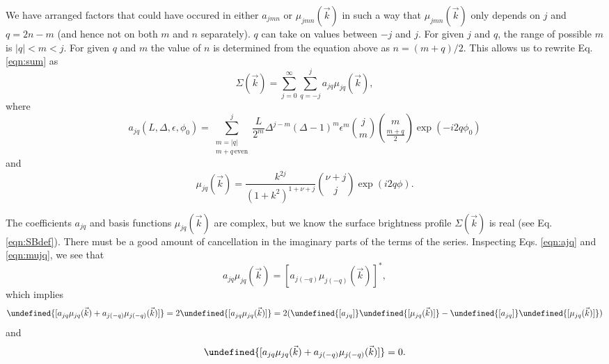 \documentclass{article}
\let\Re\undefined
\DeclareMathOperator{\Re}{Re}
\let\Im\undefined
\DeclareMathOperator{\Im}{Im}
\begin{document}
We have arranged factors that could have occured in either $a_{jmn}$ or $\mu_{jmn}(\vec{k})$ in such a way that $\mu_{jmn}(\vec{k})$ only depends on $j$ and $q = 2n-m$ (and hence not on both $m$ and $n$ separately).
$q$ can take on values between $-j$ and $j$.
For given $j$ and $q$, the range of possible $m$ is $|q| < m < j$.
For given $q$ and $m$ the value of $n$ is determined from the equation above as $n=(m+q)/2$.
This allows us to rewrite Eq. \ref{eqn:sum} as
\begin{equation}
  \label{eqn:sum_jq}
  \Sigma(\vec{k}) = \sum_{j=0}^{\infty}\sum_{q=-j}^{j} a_{jq}\mu_{jq}(\vec{k}),
\end{equation}
where
\begin{equation}
  \label{eqn:ajq}
  a_{jq}(L, \Delta, \epsilon, \phi_0) = \sum_{\substack{m=|q|\\m+q\,\mathrm{even}}}^{j}\frac{L}{2^m} \Delta^{j-m}(\Delta-1)^m\epsilon^m\binom{j}{m}\binom{m}{\frac{m+q}{2}}\exp(-i 2 q \phi_0)
\end{equation}
and
\begin{equation}
  \label{eqn:mujq}
  \mu_{jq}(\vec{k}) = \frac{k^{2j}}{(1+k^2)^{1+\nu+j}}\binom{\nu+j}{j}\exp(i 2 q \phi).
\end{equation}

The coefficients $a_{jq}$ and basis functions $\mu_{jq}(\vec{k})$ are complex, but we know the surface brightness profile $\Sigma(\vec{k})$ is real (see Eq. \ref{eqn:SBdef}).
There must be a good amount of cancellation in the imaginary parts of the terms of the series.
Inspecting Eqs. \ref{eqn:ajq} and \ref{eqn:mujq}, we see that
\begin{equation}
  a_{jq}\mu_{jq}(\vec{k}) = [a_{j(-q)}\mu_{j(-q)}(\vec{k})]^*,
\end{equation}
which implies
\begin{equation}
  \Re{[a_{jq}\mu_{jq}(\vec{k}) + a_{j(-q)}\mu_{j(-q)}(\vec{k})]} = 2\Re{[a_{jq}\mu_{jq}(\vec{k})]}
  = 2 (\Re{[a_{jq}]}\Re{[\mu_{jq}(\vec{k})]} - \Im{[a_{jq}]}\Im{[\mu_{jq}(\vec{k})]})
\end{equation}
and
\begin{equation}
  \Im{[a_{jq}\mu_{jq}(\vec{k}) + a_{j(-q)}\mu_{j(-q)}(\vec{k})]} = 0.
\end{equation}
\end{document}
